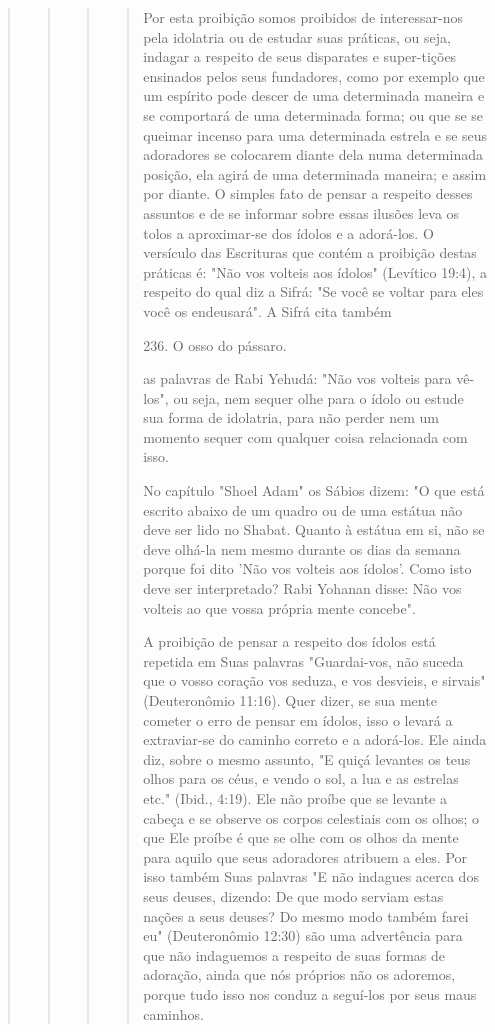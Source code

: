 \begin{quote}
\begin{quote}
\begin{quote}
\begin{quote}
Por esta proibição somos proibidos de interessar-nos pela idolatria ou
de estudar suas práticas, ou seja, indagar a respeito de seus disparates
e super-tições ensinados pelos seus fundadores, como por exemplo que um
espírito po­de descer de uma determinada maneira e se comportará de uma
determinada forma; ou que se se queimar incenso para uma determinada
estrela e se seus ado­radores se colocarem diante dela numa determinada
posição, ela agirá de uma determinada maneira; e assim por diante. O
simples fato de pensar a respeito desses assuntos e de se informar sobre
essas ilusões leva os tolos a aproximar-se dos ídolos e a adorá-los. O
versículo das Escrituras que contém a proibição des­tas práticas é: "Não
vos volteis aos ídolos" (Levítico 19:4), a respeito do qual diz a Sifrá:
"Se você se voltar para eles você os endeusará". A Sifrá cita também

236. O osso do pássaro.

as palavras de Rabi Yehudá: "Não vos volteis para vê-los", ou seja, nem
sequer olhe para o ídolo ou estude sua forma de idolatria, para não
perder nem um momento sequer com qualquer coisa relacionada com isso.

No capítulo "Shoel Adam" os Sábios dizem: "O que está escrito abai­xo de
um quadro ou de uma estátua não deve ser lido no Shabat. Quanto à
estátua em si, não se deve olhá-la nem mesmo durante os dias da semana
por­que foi dito 'Não vos volteis aos ídolos'. Como isto deve ser
interpretado? Rabi Yohanan disse: Não vos volteis ao que vossa própria
mente concebe".

A proibição de pensar a respeito dos ídolos está repetida em Suas
pa­lavras "Guardai-vos, não suceda que o vosso coração vos seduza, e vos
desvieis, e sirvais" (Deuteronômio 11:16). Quer dizer, se sua mente
cometer o erro de pen­sar em ídolos, isso o levará a extraviar-se do
caminho correto e a adorá-los. Ele ainda diz, sobre o mesmo assunto, "E
quiçá levantes os teus olhos para os céus, e vendo o sol, a lua e as
estrelas etc." (Ibid., 4:19). Ele não proíbe que se levante a cabeça e
se observe os corpos celestiais com os olhos; o que Ele proíbe é que se
olhe com os olhos da mente para aquilo que seus adoradores atribuem a
eles. Por isso também Suas palavras "E não indagues acerca dos seus
deuses, dizendo: De que modo serviam estas nações a seus deuses? Do
mesmo modo também fa­rei eu" (Deuteronômio 12:30) são uma advertência
para que não indaguemos a respeito de suas formas de adoração, ainda que
nós próprios não os adoremos, porque tudo isso nos conduz a seguí-los
por seus maus caminhos.


\end{quote}
\end{quote}
\end{quote}
\end{quote}
